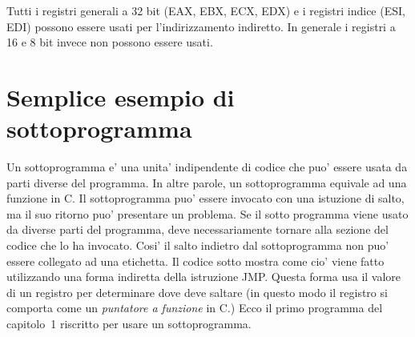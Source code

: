 Tutti i registri generali a 32 bit (EAX, EBX, ECX, EDX) e i registri indice
(ESI, EDI) possono essere usati per l'indirizzamento indiretto. In generale
i registri a 16 e 8 bit invece non possono essere usati.

\section{Semplice esempio di sottoprogramma}

Un sottoprogramma e' una unita' indipendente di codice che puo' essere usata
da parti diverse del programma. In altre parole, un sottoprogramma equivale
ad una funzione in C. Il sottoprogramma puo' essere invocato con una 
istuzione di salto, ma il suo ritorno puo' presentare un problema. Se il 
sotto programma viene usato da diverse parti del programma, deve necessariamente
tornare alla sezione del codice che lo ha invocato. Cosi' il salto indietro
dal sottoprogramma non puo' essere collegato ad una etichetta. Il codice sotto
mostra come cio' viene fatto utilizzando una forma indiretta della istruzione
{\code JMP}. Questa forma usa il valore di un registro per determinare dove
deve saltare (in questo modo il registro si comporta come un \emph{puntatore
a funzione} in C.) 
Ecco il primo programma del capitolo~1 riscritto per usare un sottoprogramma. 
